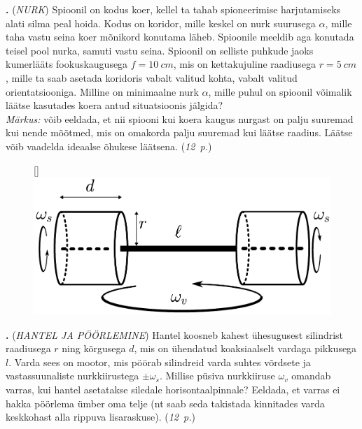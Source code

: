 \documentclass[11pt,a5paper]{article}
\newcommand{\numb}[1]{\vspace{5pt}\textbf{\large #1}}
\newcommand{\nimi}[1]{(\textsl{\small #1})}
\newcommand{\punktid}[1]{(\emph{#1~p.})}
\newcounter{ylesanne}
\newcommand{\yl}[1]{\addtocounter{ylesanne}{1}\numb{\theylesanne.} \nimi{#1} \newblock{}}
\newcommand{\autor}[1]{}%
\begin{document}
\yl{NURK}
Spioonil on kodus koer, kellel ta tahab spioneerimise harjutamiseks alati silma peal hoida. Kodus on koridor, mille keskel on nurk suurusega $\alpha$, mille taha vastu seina koer mõnikord konutama läheb. Spioonile meeldib aga konutada teisel pool nurka, samuti vastu seina. Spioonil on selliste puhkude jaoks kumerlääts fookuskaugusega $f=\SI{10}{cm}$, mis on kettakujuline raadiusega $r=\SI{5}{cm}$, mille ta saab asetada koridoris vabalt valitud kohta, vabalt valitud orientatsiooniga. Milline on minimaalne nurk $\alpha$, mille puhul on spioonil võimalik läätse kasutades koera antud situatsioonis jälgida?\\
\emph{Märkus:} võib eeldada, et nii spiooni kui koera kaugus nurgast on palju suuremad kui nende mõõtmed, mis on omakorda palju suuremad kui läätse raadius. Läätse võib vaadelda ideaalse õhukese läätsena.
\punktid{12} \autor{Kaarel Hänni}

\begin{figure}
\raisebox{0pt}[\dimexpr{}\baselineskip\relax]{\includegraphics[scale=0.37]{hantel_joonis.pdf}}
\vspace{-15pt}
\end{figure}
\yl{HANTEL JA PÖÖRLEMINE}
Hantel koosneb kahest ühesugusest silindrist raadiusega $r$ ning kõrgusega $d$, mis on ühendatud koaksiaalselt vardaga pikkusega $l$. Varda sees on mootor, mis pöörab silindreid varda suhtes võrdsete ja vastassuunaliste nurkkiirustega $\pm \omega_s$. Millise püsiva nurkkiiruse $\omega_v$ omandab varras, kui hantel asetatakse siledale horisontaalpinnale? Eeldada, et varras ei hakka pöörlema ümber oma telje (nt saab seda takistada kinnitades varda keskkohast alla rippuva lisaraskuse).
\punktid{12} \autor{Marko Tsengov}
\end{document}
